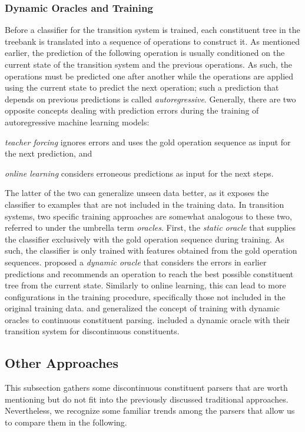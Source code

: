 \documentclass[../document.tex]{subfiles}
\begin{document}
    \subsubsection*{Dynamic Oracles and Training}
    Before a classifier for the transition system is trained, each constituent tree in the treebank is translated into a sequence of operations to construct it.
    As mentioned earlier, the prediction of the following operation is usually conditioned on the current state of the transition system and the previous operations.
    As such, the operations must be predicted one after another while the operations are applied using the current state to predict the next operation; such a prediction that depends on previous predictions is called \emph{autoregressive}.
    Generally, there are two opposite concepts dealing with prediction errors during the training of autoregressive machine learning models:
    \begin{compactitem}
        \item \emph{teacher forcing} ignores errors and uses the gold operation sequence as input for the next prediction, and
        \item \emph{online learning} considers erroneous predictions as input for the next steps.
    \end{compactitem}
    The latter of the two can generalize unseen data better, as it exposes the classifier to examples that are not included in the training data.
    In transition systems, two specific training approaches are somewhat analogous to these two, referred to under the umbrella term \emph{oracles}.
    First, the \emph{static oracle} that supplies the classifier exclusively with the gold operation sequence during training.
    As such, the classifier is only trained with features obtained from the gold operation sequences.
     proposed a \emph{dynamic oracle} that considers the errors in earlier predictions and recommends an operation to reach the best possible constituent tree from the current state.
    Similarly to online learning, this can lead to more configurations in the training procedure, specifically those not included in the original training data.
     and \citet{Cross16} generalized the concept of training with dynamic oracles to continuous constituent parsing.
     included a dynamic oracle with their transition system for discontinuous constituents.

    \subsection{Other Approaches}\label{sec:literature:others}
    This subsection gathers some discontinuous constituent parsers that are worth mentioning but do not fit into the previously discussed traditional approaches.
    Nevertheless, we recognize some familiar trends among the parsers that allow us to compare them in the following.
\end{document}
